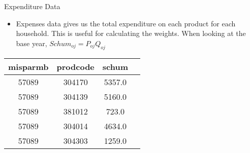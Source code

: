 \documentclass{beamer}
\begin{document}
\begin{frame}{Expenditure Data}
    \begin{itemize}
        \item Expenses data gives us the total expenditure on each product for each household. This is useful for calculating the weights. When looking at the base year, $Schum_{oj} = P_{oj}Q_{oj}$
    \end{itemize}
    \begin{table}[h]
        \centering
        \begin{tabular}{c c c c}
            \hline
            \textbf{misparmb} & \textbf{prodcode} & \textbf{schum} \\
            \hline
            57089             & 304170            & 5357.0         \\
            57089             & 304139            & 5160.0         \\
            57089             & 381012            & 723.0          \\
            57089             & 304014            & 4634.0         \\
            57089             & 304303            & 1259.0         \\
            \hline
        \end{tabular}
        \label{tab:expenses_table}
    \end{table}
\end{frame}
\end{document}
